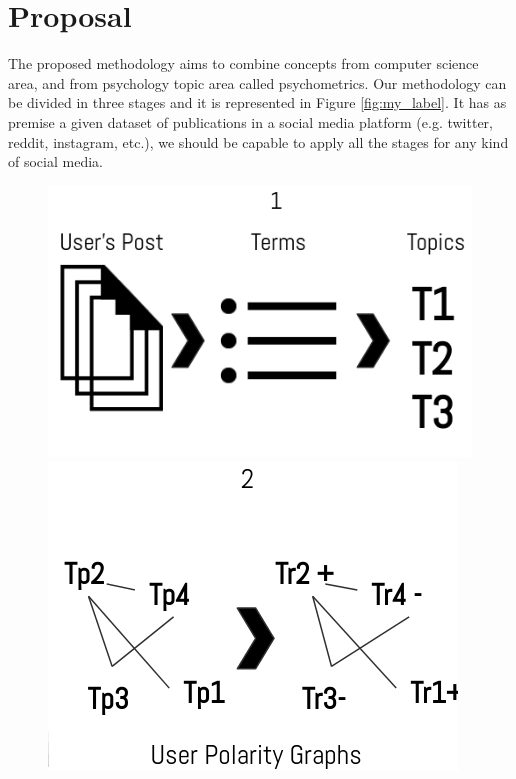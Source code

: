 \chapter{Proposal}\label{cap:proposal}

The proposed methodology aims to combine concepts from computer science area, and from psychology topic area called psychometrics.
Our methodology can be divided in three stages and it is represented in Figure \ref{fig:my_label}. It has as premise a given dataset of publications in a social media platform (e.g. twitter, reddit, instagram, etc.), we should be capable to apply all the stages for any kind of social media. 

\begin{figure}[!h]
    \centering
    \includegraphics[scale=.5]{figs/method_1.png}
    \hspace{.5cm}
    \includegraphics[scale=.5]{figs/method_2.png}\\
    \vspace{.2cm}

\end{figure}
